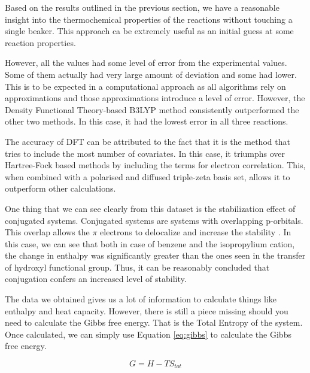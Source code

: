 Based on the results outlined in the previous section, we have a reasonable insight into the thermochemical properties of the reactions without touching a single beaker. This approach ca be extremely useful as an initial guess at some reaction properties.

However, all the values had some level of error from the experimental values. Some of them actually had very large amount of deviation and some had lower. This is to  be expected in a computational approach as all algorithms rely on approximations and those approximations introduce a level of error. However, the Density Functional Theory-based B3LYP method consistently outperformed the other two methods. In this case, it had the lowest error in all three  reactions.

The accuracy of DFT can be attributed to the fact that it is the method that tries to include the most number of covariates. In this case, it triumphs over Hartree-Fock based methods by including the terms for electron correlation. This, when combined with a polarised and diffused triple-zeta basis set, allows it to outperform other calculations.

One thing that we can see clearly from this dataset is the stabilization effect of conjugated systems. Conjugated systems are systems with overlapping p-orbitals. This overlap allows the $\pi$ electrons to delocalize and increase the stability \cite{smith_marchs_2006}. In this case, we can see that both in case of benzene and the isopropylium cation, the change in enthalpy was significantly greater than the ones seen in the transfer of hydroxyl functional group. Thus, it can be reasonably concluded that conjugation confers an increased level of stability.

The data we obtained gives us a lot of information to calculate things like enthalpy and heat capacity. However, there is still a piece missing should you need to calculate the Gibbs free energy. That is the Total Entropy of the system. Once calculated, we can simply use Equation \ref{eq:gibbs} to calculate the Gibbs free energy.

\begin{equation}\label{eq:gibbs}
    G = H - TS_{tot}
\end{equation}